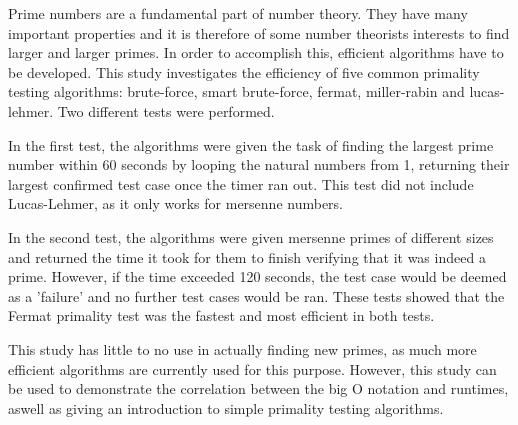 \documentclass[main.tex]{subfiles}
\begin{document}
Prime numbers are a fundamental part of number theory. They have many important
properties and it is therefore of some number theorists interests to find larger
and larger primes. In order to accomplish this, efficient algorithms have to be developed. This study investigates the efficiency of five
common primality testing algorithms: brute-force, smart brute-force, fermat,
miller-rabin and lucas-lehmer. Two different tests were performed.

In the first test, the algorithms were given the task of finding the largest prime number
within 60 seconds by looping the natural numbers from 1, returning their largest
confirmed test case once the timer ran out. This test did not include
Lucas-Lehmer, as it only works for mersenne numbers.

In the second test, the
algorithms were given mersenne primes of different sizes and returned the time
it took for them to finish verifying that it was indeed a prime. However, if the
time exceeded 120 seconds, the test case would be deemed as a 'failure' and no
further test cases would be ran. These tests showed that the Fermat primality
test was the fastest and most efficient in both tests.

This study has little to no use in actually finding new primes, as much more
efficient algorithms are currently used for this purpose. However, this study
can be used to demonstrate the correlation between the big O notation and
runtimes, aswell as giving an introduction to simple primality testing
algorithms. 
\end{document}
